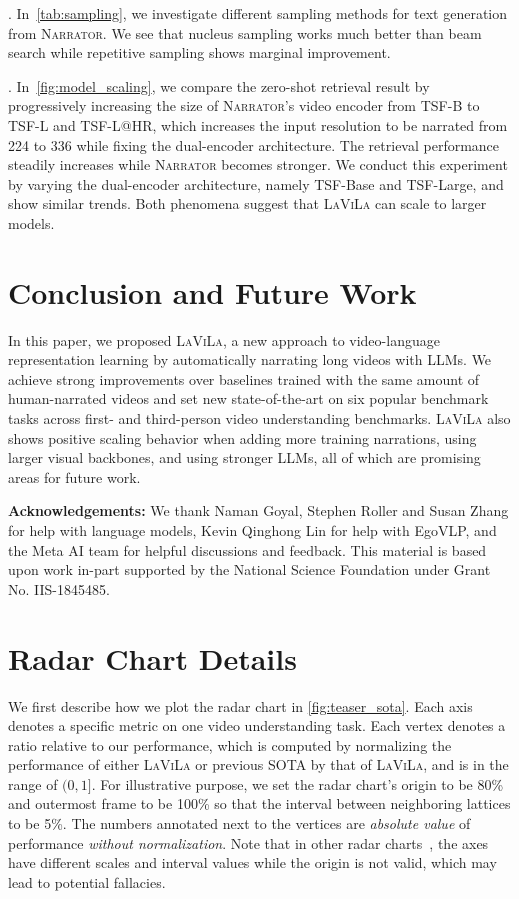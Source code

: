 \documentclass[10pt,twocolumn,letterpaper]{article}
\newcommand{\myparagraph}[1]{\vspace{0pt}\noindent{\bf #1}}
\newcommand{\ours}{\textsc{LaViLa}\xspace}
\newcommand{\narrator}{\textsc{Narrator}\xspace}
\begin{document}
\myparagraph{Sampling}.
In~\cref{tab:sampling}, we investigate different sampling methods for text generation from \narrator.
We see that nucleus sampling works much better than beam search while repetitive sampling shows marginal improvement.

\myparagraph{Scaling effect}.
In~\cref{fig:model_scaling}, we compare the zero-shot retrieval result by progressively increasing the size of \narrator's video encoder from TSF-B to TSF-L and TSF-L@HR, which increases the input resolution to be narrated from 224 to 336 while fixing the dual-encoder architecture.
The retrieval performance steadily increases while \narrator becomes stronger.
We conduct this experiment by varying the dual-encoder architecture, namely TSF-Base and TSF-Large, and show similar trends.
Both phenomena suggest that \ours can scale to larger models.

 \section{Conclusion and Future Work}

In this paper, we proposed \ours, a new approach to video-language representation learning by automatically narrating long videos with LLMs. We achieve strong improvements over baselines trained with the same amount of human-narrated videos and set new state-of-the-art on six popular benchmark tasks across first- and third-person video understanding benchmarks. \ours also shows positive scaling behavior when adding more training narrations, using larger visual backbones, and using stronger LLMs, all of which are promising areas for future work.
 
{\noindent \bf Acknowledgements:}
We thank Naman Goyal, Stephen Roller and Susan Zhang for help with language models,
Kevin Qinghong Lin for help with EgoVLP, and the Meta AI team for helpful discussions and feedback.
This material is based upon work in-part supported by the National Science Foundation under Grant No. IIS-1845485. 
{\small


}

\clearpage
\appendix

\section{Radar Chart  Details}
\label{sec:appdx:radar_chart}
We first describe how we plot the radar chart in \cref{fig:teaser_sota}.
Each axis denotes a specific metric on one video understanding task.
Each vertex denotes a ratio relative to our performance, which is computed by normalizing the performance of either \ours or previous SOTA by that of \ours, and is in the range of $(0, 1]$.
For illustrative purpose, we set the radar chart's origin to be 80\% and outermost frame to be 100\% so that the interval between neighboring lattices to be 5\%.
The numbers annotated next to the vertices are {\em absolute value} of performance {\em without normalization}.
Note that in other radar charts~\cite{yu2022coca,wang2022beitv3}, the axes have different scales and interval values while the origin is not valid, which may lead to potential fallacies.
\end{document}
